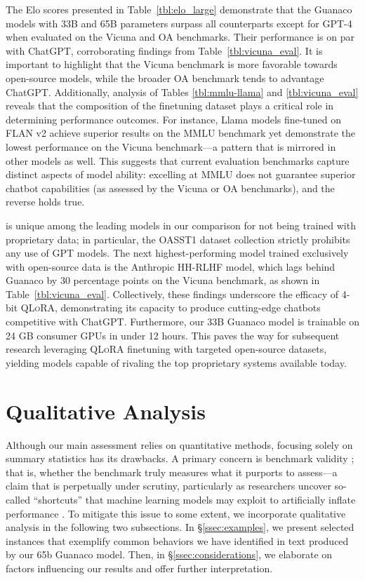 The Elo scores presented in Table~\ref{tbl:elo_large} demonstrate that the {Guanaco} models with 33B and 65B parameters surpass all counterparts except for GPT-4 when evaluated on the Vicuna and OA benchmarks. Their performance is on par with ChatGPT, corroborating findings from Table~\ref{tbl:vicuna_eval}. It is important to highlight that the Vicuna benchmark is more favorable towards open-source models, while the broader OA benchmark tends to advantage ChatGPT. Additionally, analysis of Tables \ref{tbl:mmlu-llama} and \ref{tbl:vicuna_eval} reveals that the composition of the finetuning dataset plays a critical role in determining performance outcomes. For instance, Llama models fine-tuned on FLAN v2 achieve superior results on the MMLU benchmark yet demonstrate the lowest performance on the Vicuna benchmark—a pattern that is mirrored in other models as well. This suggests that current evaluation benchmarks capture distinct aspects of model ability: excelling at MMLU does not guarantee superior chatbot capabilities (as assessed by the Vicuna or OA benchmarks), and the reverse holds true.

 is unique among the leading models in our comparison for not being trained with proprietary data; in particular, the OASST1 dataset collection strictly prohibits any use of GPT models. The next highest-performing model trained exclusively with open-source data is the Anthropic HH-RLHF model, which lags behind {Guanaco} by 30 percentage points on the Vicuna benchmark, as shown in Table~\ref{tbl:vicuna_eval}. Collectively, these findings underscore the efficacy of 4-bit \textsc{QLoRA}, demonstrating its capacity to produce cutting-edge chatbots competitive with ChatGPT. Furthermore, our 33B {Guanaco} model is trainable on 24 GB consumer GPUs in under 12 hours. This paves the way for subsequent research leveraging \textsc{QLoRA} finetuning with targeted open-source datasets, yielding models capable of rivaling the top proprietary systems available today.

\section{Qualitative Analysis}

Although our main assessment relies on quantitative methods, focusing solely on summary statistics has its drawbacks. A primary concern is benchmark validity \citep{liao2021we}; that is, whether the benchmark truly measures what it purports to assess—a claim that is perpetually under scrutiny, particularly as researchers uncover so-called ``shortcuts'' that machine learning models may exploit to artificially inflate performance \citep{gururangan2018annotation, poliak2018hypothesis}. To mitigate this issue to some extent, we incorporate qualitative analysis in the following two subsections. In \S\ref{ssec:examples}, we present selected instances that exemplify common behaviors we have identified in text produced by our 65b {Guanaco} model. Then, in \S\ref{ssec:considerations}, we elaborate on factors influencing our results and offer further interpretation.

